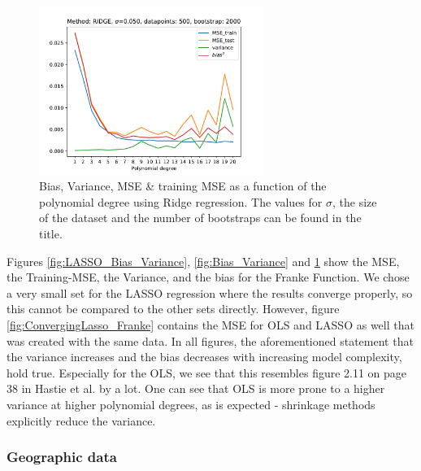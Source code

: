 \documentclass[11pt,a4paper,titlepage]{article}
\begin{document}
\begin{figure}[H]
\centering
\includegraphics[width=0.65\textwidth]{Bias_Variance_RIDGE.pdf}
\caption[Bias, Variance, MSE \& training MSE as a function of the polynomial degree using Ridge regression]{Bias, Variance, MSE \& training MSE as a function of the polynomial degree using Ridge regression. The values for $\sigma$, the size of the dataset and the number of bootstraps can be found in the title.}
\label{fig:Ridge_Bias_Variance}
\end{figure}
Figures \ref{fig:LASSO_Bias_Variance}, \ref{fig:Bias_Variance} and \ref{fig:Ridge_Bias_Variance} show the MSE, the Training-MSE, the Variance, and the bias for the Franke Function. We chose a very small set for the LASSO regression where the results converge properly, so this cannot be compared to the other sets directly. However, figure \ref{fig:ConvergingLasso_Franke} contains the MSE for OLS and LASSO as well that was created with the same data. In all figures, the aforementioned statement that the variance increases and the bias decreases with increasing model complexity, hold true. Especially for the OLS, we see that this resembles  figure 2.11 on page 38 in Hastie et al. by a lot\citep{hastie01statisticallearning}. One can see that OLS is more prone to a higher variance at higher polynomial degrees, as is expected - shrinkage methods explicitly reduce the variance. 

\subsubsection{Geographic data}
\end{document}
